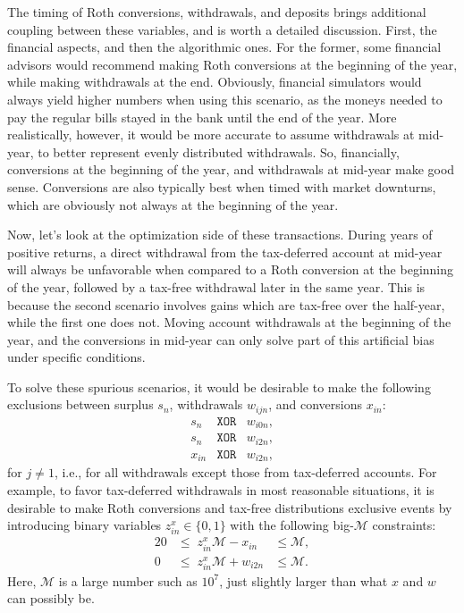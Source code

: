 \documentclass{report}[fleqn,12pt]
\begin{document}
	The timing of Roth conversions, withdrawals, and deposits brings
	additional coupling between these variables, and is worth a detailed discussion.
	First, the financial aspects, and then the algorithmic ones.
	For the former, some financial advisors would recommend making Roth
	conversions at the beginning of the year, while making withdrawals
	at the end. Obviously, financial simulators would always yield higher numbers
	when using this scenario, as the moneys needed to pay the regular bills 
	stayed in the bank until the end of the year. More realistically,
	however, it would be more accurate to assume withdrawals at mid-year,
	to better represent evenly distributed withdrawals. So, financially,
	conversions at the beginning of the year, and withdrawals at mid-year
	make good sense. Conversions are also typically best when
	timed with market downturns, which are obviously not always at the
	beginning of the year.

	Now, let's look at the optimization side of these transactions.
	During years of positive returns,
	a direct withdrawal from the tax-deferred account at mid-year will always
	be unfavorable when compared to a Roth conversion
	at the beginning of the year, followed
	by a tax-free withdrawal later in the same year.
	This is because the second
	scenario involves gains which are tax-free over the half-year, while
	the first one does not. Moving account withdrawals at the beginning
	of the year, and the conversions in mid-year can only solve part of this artificial bias
	under specific conditions.

	To solve these spurious scenarios, it would be desirable to make the following exclusions
	between surplus $s_n$, withdrawals $w_{ijn}$, and conversions $x_{in}$:
	\begin{eqnarray*}
		s_n &\texttt{XOR} & w_{i0n}, \\
		s_n &\texttt{XOR} & w_{i2n}, \\
		x_{in} &\texttt{XOR} & w_{i2n},
	\end{eqnarray*}
	for $j \neq 1$, i.e., for all withdrawals except those from tax-deferred accounts.
	For example, to favor tax-deferred withdrawals in most reasonable situations,
	it is desirable to make Roth conversions and tax-free distributions exclusive events
	by introducing binary variables $z_{in}^x \in \{0, 1\}$ with the following big-$\mathcal{M}$
	constraints:
	\begin{alignat}{2}
		\label{Eq:Binary}
		0 & \le \; z_{in}^x \mathcal{M} - x_{in} &\le \mathcal{M}, \nonumber \\
		0 & \le \; z_{in}^x \mathcal{M} + w_{i2n} &\le \mathcal{M}.
	\end{alignat}
	Here, $\mathcal{M}$ is a large number such as $10^7$, just slightly
	larger than what $x$ and $w$ can possibly be.
\end{document}
